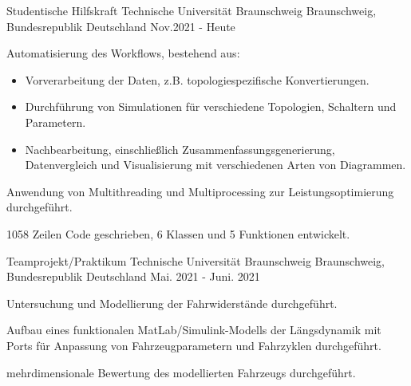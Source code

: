 

\begin{cventries}

  \cventry
  {Studentische Hilfskraft} %
  {Technische Universität Braunschweig} %
  {Braunschweig, Bundesrepublik Deutschland} %
  {Nov.2021 - Heute} %
  {
    \begin{cvitems} %
      \item {Automatisierung des Workflows, bestehend aus:
                  \begin{itemize}
                    \item Vorverarbeitung der Daten, z.B. topologiespezifische Konvertierungen.
                    \item Durchführung von Simulationen für verschiedene Topologien, Schaltern und Parametern.
                    \item Nachbearbeitung, einschließlich Zusammenfassungsgenerierung, Datenvergleich und Visualisierung mit verschiedenen Arten von Diagrammen.
                  \end{itemize}}
      \item {Anwendung von Multithreading und Multiprocessing zur Leistungsoptimierung durchgeführt.}
      \item {1058 Zeilen Code geschrieben, 6 Klassen und 5 Funktionen entwickelt.}
    \end{cvitems}
  }

  \cventry
  {Teamprojekt/Praktikum} %
  {Technische Universität Braunschweig} %
  {Braunschweig, Bundesrepublik Deutschland} %
  {Mai. 2021 - Juni. 2021} %
  {
    \begin{cvitems} %
      \item {Untersuchung und Modellierung der Fahrwiderstände durchgeführt.}
      \item {Aufbau eines funktionalen MatLab/Simulink-Modells der Längsdynamik mit Ports für Anpassung von Fahrzeugparametern und Fahrzyklen durchgeführt.}
      \item {mehrdimensionale Bewertung des modellierten Fahrzeugs durchgeführt.}
    \end{cvitems}
  }


\end{cventries}
